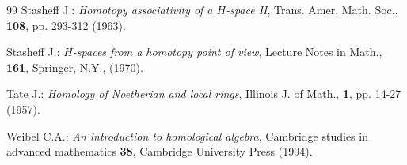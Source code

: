 \begin{thebibliography}{99}
 Stasheff J.: {\em Homotopy associativity of a
$H$-space II}, Trans. Amer. Math. Soc., {\bf 108}, pp. 293-312
(1963).

 Stasheff J.: {\em $H$-spaces from a homotopy point of
view}, Lecture Notes in Math., {\bf 161}, Springer, N.Y., (1970).

 Tate J.: {\em Homology of Noetherian and local rings},
Illinois J. of Math., {\bf 1}, pp. 14-27 (1957).

 Weibel C.A.: {\em An introduction to homological
algebra}, Cambridge studies in advanced mathematics {\bf 38}, Cambridge
University Press (1994).

\end{thebibliography}




